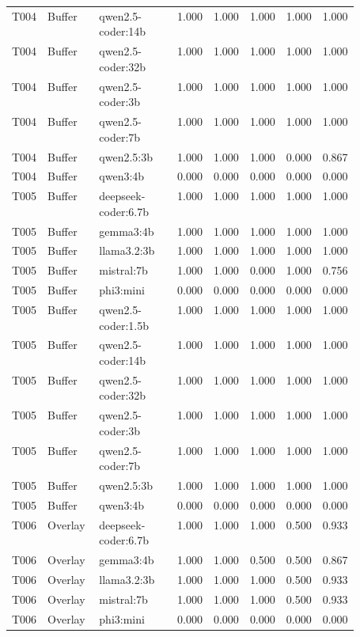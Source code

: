 \begin{longtable}{p{0.08\linewidth}p{0.16\linewidth}p{0.27\linewidth}rrrrr}
T004 & Buffer & qwen2.5-coder:14b & 1.000 & 1.000 & 1.000 & 1.000 & 1.000 \\
T004 & Buffer & qwen2.5-coder:32b & 1.000 & 1.000 & 1.000 & 1.000 & 1.000 \\
T004 & Buffer & qwen2.5-coder:3b & 1.000 & 1.000 & 1.000 & 1.000 & 1.000 \\
T004 & Buffer & qwen2.5-coder:7b & 1.000 & 1.000 & 1.000 & 1.000 & 1.000 \\
T004 & Buffer & qwen2.5:3b & 1.000 & 1.000 & 1.000 & 0.000 & 0.867 \\
T004 & Buffer & qwen3:4b & 0.000 & 0.000 & 0.000 & 0.000 & 0.000 \\
T005 & Buffer & deepseek-coder:6.7b & 1.000 & 1.000 & 1.000 & 1.000 & 1.000 \\
T005 & Buffer & gemma3:4b & 1.000 & 1.000 & 1.000 & 1.000 & 1.000 \\
T005 & Buffer & llama3.2:3b & 1.000 & 1.000 & 1.000 & 1.000 & 1.000 \\
T005 & Buffer & mistral:7b & 1.000 & 1.000 & 0.000 & 1.000 & 0.756 \\
T005 & Buffer & phi3:mini & 0.000 & 0.000 & 0.000 & 0.000 & 0.000 \\
T005 & Buffer & qwen2.5-coder:1.5b & 1.000 & 1.000 & 1.000 & 1.000 & 1.000 \\
T005 & Buffer & qwen2.5-coder:14b & 1.000 & 1.000 & 1.000 & 1.000 & 1.000 \\
T005 & Buffer & qwen2.5-coder:32b & 1.000 & 1.000 & 1.000 & 1.000 & 1.000 \\
T005 & Buffer & qwen2.5-coder:3b & 1.000 & 1.000 & 1.000 & 1.000 & 1.000 \\
T005 & Buffer & qwen2.5-coder:7b & 1.000 & 1.000 & 1.000 & 1.000 & 1.000 \\
T005 & Buffer & qwen2.5:3b & 1.000 & 1.000 & 1.000 & 1.000 & 1.000 \\
T005 & Buffer & qwen3:4b & 0.000 & 0.000 & 0.000 & 0.000 & 0.000 \\
T006 & Overlay & deepseek-coder:6.7b & 1.000 & 1.000 & 1.000 & 0.500 & 0.933 \\
T006 & Overlay & gemma3:4b & 1.000 & 1.000 & 0.500 & 0.500 & 0.867 \\
T006 & Overlay & llama3.2:3b & 1.000 & 1.000 & 1.000 & 0.500 & 0.933 \\
T006 & Overlay & mistral:7b & 1.000 & 1.000 & 1.000 & 0.500 & 0.933 \\
T006 & Overlay & phi3:mini & 0.000 & 0.000 & 0.000 & 0.000 & 0.000 \\

\end{longtable}

